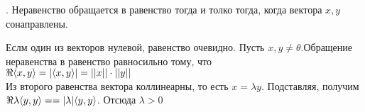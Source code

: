 . Неравенство обращается в равенство тогда и толко тогда, когда вектора $x, y$сонаправлены.

\D Еслм один из векторов нулевой, равенство очевидно. Пусть $x, y \neq \theta$.Обращение неравенства в равенство равносильно тому, что\\
$\Re\langle x, y \rangle = |\langle x, y \rangle| = ||x||\cdot||y||$\\
Из второго равенства вектора коллинеарны, то есть $x = \lambda y$. Подставляя, получим $\Re\lambda \langle y, y \rangle = = |\lambda|\langle y, y \rangle$. Отсюда $\lambda > 0$